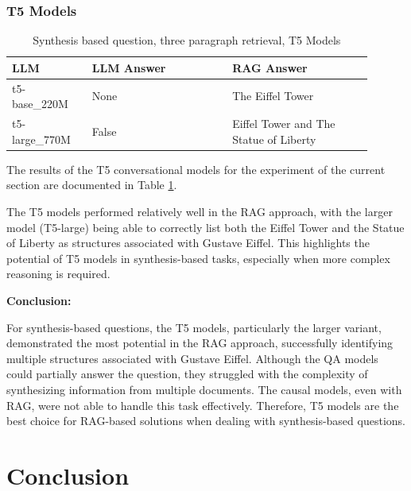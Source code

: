 \documentclass{wseas}
\begin{document}
\subsubsection{T5 Models}

\begin{table}[htbp]
  \centering
  \label{tab:experiment_R_3_paragraph_Q_synthesis_M_T5Models_table}  %
  \caption{Synthesis based question, three paragraph retrieval, T5 Models} %
  \begin{tabular}{|p{0.20\linewidth}|p{0.35\linewidth}|p{0.35\linewidth}|}
    \hline
    \textbf{LLM} & \textbf{LLM Answer} & \textbf{RAG Answer} \\
    \hline
    t5-base\_220M & None & The Eiffel Tower \\
    \hline
    t5-large\_770M & False & Eiffel Tower and The Statue of Liberty \\
    \hline
  \end{tabular}
\end{table}

The results of the T5 conversational models for the experiment of the current section
are documented in Table \ref{tab:experiment_R_3_paragraph_Q_synthesis_M_T5Models_table}.

The T5 models performed relatively well in the RAG approach, with the
larger model (T5-large) being able to correctly list both the Eiffel
Tower and the Statue of Liberty as structures associated with Gustave
Eiffel. This highlights the potential of T5 models in synthesis-based
tasks, especially when more complex reasoning is required.

\textbf{Conclusion:}

For synthesis-based questions, the T5 models, particularly the larger
variant, demonstrated the most potential in the RAG approach,
successfully identifying multiple structures associated with Gustave
Eiffel. Although the QA models could partially answer the question, they
struggled with the complexity of synthesizing information from multiple
documents. The causal models, even with RAG, were not able to handle
this task effectively. Therefore, T5 models are the best choice for
RAG-based solutions when dealing with synthesis-based questions.


\section{Conclusion}
\end{document}
